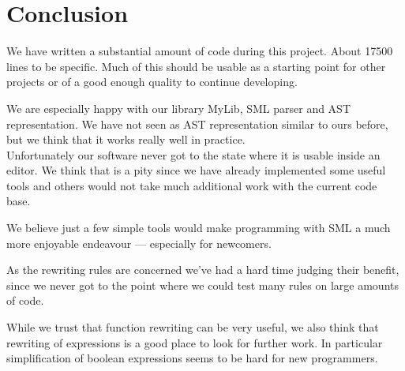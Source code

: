 \chapter{Conclusion}
We have written a substantial amount of code during this project. About 17500
lines to be specific. Much of this should be usable as a starting point for
other projects or of a good enough quality to continue developing.

We are especially happy with our library MyLib, SML parser and AST
representation. We have not seen as AST representation similar to ours before,
but we think that it works really well in practice.\\[1em]

\noindent
Unfortunately our software never got to the state where it is usable inside an
editor. We think that is a pity since we have already implemented some useful
tools and others would not take much additional work with the current code
base.

We believe just a few simple tools would make programming with SML a much more
enjoyable endeavour --- especially for newcomers.

As the rewriting rules are concerned we've had a hard time judging their
benefit, since we never got to the point where we could test many rules on large
amounts of code.

While we trust that function rewriting can be very useful, we also think that
rewriting of expressions is a good place to look for further
work. In particular simplification of boolean expressions seems to be hard for
new programmers.


